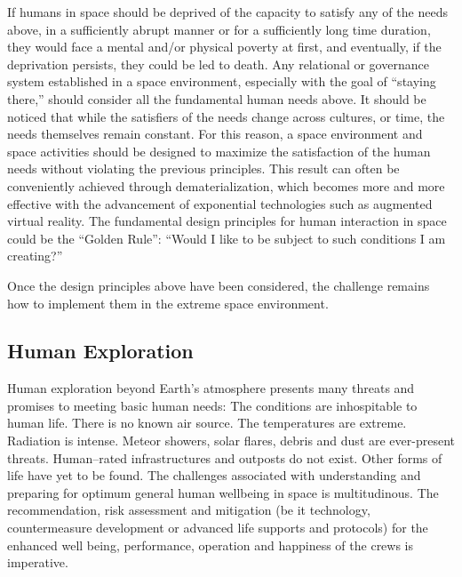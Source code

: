 \documentclass[letter,11pt]{article}
\begin{document}
If humans in space should be deprived of the capacity to satisfy any of the
needs above, in a sufficiently abrupt manner or for a sufficiently long time
duration, they would face a mental and/or physical poverty at first, and
eventually, if the deprivation persists, they could be led to death. Any
relational or governance system established in a space environment, especially
with the goal of ``staying there,'' should consider all the fundamental human
needs above. It should be noticed that while the satisfiers of the needs change
across cultures, or time, the needs themselves remain constant. For this
reason, a space environment and space activities should be designed to maximize
the satisfaction of the human needs without violating the previous principles.
This result can often be conveniently achieved through dematerialization, which
becomes more and more effective with the advancement of exponential
technologies such as augmented virtual reality. The fundamental design
principles for human interaction in space could be the ``Golden Rule'': ``Would
I like to be subject to such conditions I am creating?''

Once the design principles above have been considered, the challenge remains
how to implement them in the extreme space environment.

\subsection{Human Exploration}
\label{ps-human-exploration}


Human exploration beyond Earth's atmosphere presents many threats and promises
to meeting basic human needs: The conditions are inhospitable to human life.
There is no known air source. The temperatures are extreme. Radiation is
intense. Meteor showers, solar flares, debris and dust are ever-present
threats. Human--rated infrastructures and outposts do not exist. Other forms of
life have yet to be found.  The challenges associated with understanding and
preparing for optimum general human wellbeing in space is multitudinous. The
recommendation, risk assessment and mitigation (be it technology,
countermeasure development or advanced life supports and protocols) for the
enhanced well being, performance, operation and happiness of the crews is
imperative.
\end{document}
